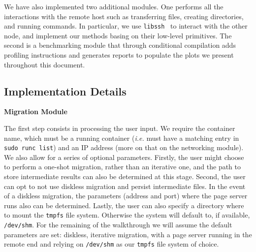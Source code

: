 We have also implemented two additional modules.
One performs all the interactions with the remote host such as transferring files, creating directories, and running \criu commands.
In particular, we use \texttt{libssh}~\cite{libssh} to interact with the other node, and implement our methods basing on their low-level primitives.
The second is a benchmarking module that through conditional compilation adds profiling instructions and generates reports to populate the plots we present throughout this document.

\subsection{Implementation Details}

\textbf{Migration Module}

The first step consists in processing the user input.
We require the container name, which must be a running container (\textit{i.e.} must have a matching entry in \texttt{sudo runc list}) and an IP address (more on that on the networking module).
We also allow for a series of optional parameters.
Firstly, the user might choose to perform a one-shot migration, rather than an iterative one, and the path to store intermediate results can also be determined at this stage.
Second, the user can opt to not use diskless migration and persist intermediate files.
In the event of a diskless migration, the parameters (address and port) where the page server runs also can be determined.
Lastly, the user can also specify a directory where to mount the \texttt{tmpfs} file system.
Otherwise the system will default to, if available, \texttt{/dev/shm}.
For the remaining of the walkthrough we will assume the default parameters are set: diskless, iterative migration, with a page server running in the remote end and relying on \texttt{/dev/shm} as our \texttt{tmpfs} file system of choice.

